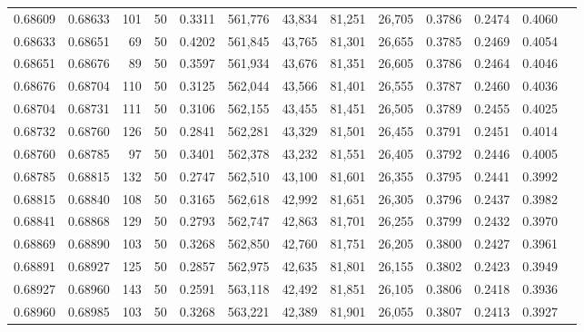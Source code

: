 \begin{tabular}{rrrrrrrrrrrrr}
0.68609 & 0.68633 &   101 &  50 &                                     0.3311 & 561,776 &  43,834 &  81,251 &  26,705 & 0.3786 & 0.2474 & 0.4060 \\
0.68633 & 0.68651 &    69 &  50 &                                     0.4202 & 561,845 &  43,765 &  81,301 &  26,655 & 0.3785 & 0.2469 & 0.4054 \\
0.68651 & 0.68676 &    89 &  50 &                                     0.3597 & 561,934 &  43,676 &  81,351 &  26,605 & 0.3786 & 0.2464 & 0.4046 \\
0.68676 & 0.68704 &   110 &  50 &                                     0.3125 & 562,044 &  43,566 &  81,401 &  26,555 & 0.3787 & 0.2460 & 0.4036 \\
0.68704 & 0.68731 &   111 &  50 &                                     0.3106 & 562,155 &  43,455 &  81,451 &  26,505 & 0.3789 & 0.2455 & 0.4025 \\
0.68732 & 0.68760 &   126 &  50 &                                     0.2841 & 562,281 &  43,329 &  81,501 &  26,455 & 0.3791 & 0.2451 & 0.4014 \\
0.68760 & 0.68785 &    97 &  50 &                                     0.3401 & 562,378 &  43,232 &  81,551 &  26,405 & 0.3792 & 0.2446 & 0.4005 \\
0.68785 & 0.68815 &   132 &  50 &                                     0.2747 & 562,510 &  43,100 &  81,601 &  26,355 & 0.3795 & 0.2441 & 0.3992 \\
0.68815 & 0.68840 &   108 &  50 &                                     0.3165 & 562,618 &  42,992 &  81,651 &  26,305 & 0.3796 & 0.2437 & 0.3982 \\
0.68841 & 0.68868 &   129 &  50 &                                     0.2793 & 562,747 &  42,863 &  81,701 &  26,255 & 0.3799 & 0.2432 & 0.3970 \\
0.68869 & 0.68890 &   103 &  50 &                                     0.3268 & 562,850 &  42,760 &  81,751 &  26,205 & 0.3800 & 0.2427 & 0.3961 \\
0.68891 & 0.68927 &   125 &  50 &                                     0.2857 & 562,975 &  42,635 &  81,801 &  26,155 & 0.3802 & 0.2423 & 0.3949 \\
0.68927 & 0.68960 &   143 &  50 &                                     0.2591 & 563,118 &  42,492 &  81,851 &  26,105 & 0.3806 & 0.2418 & 0.3936 \\
0.68960 & 0.68985 &   103 &  50 &                                     0.3268 & 563,221 &  42,389 &  81,901 &  26,055 & 0.3807 & 0.2413 & 0.3927 \\

\end{tabular}
